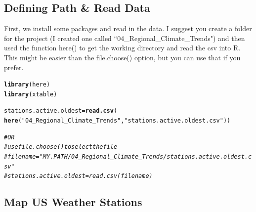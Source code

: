\documentclass{article}\usepackage[]{graphicx}\usepackage[]{xcolor}
\makeatletter
\newcommand{\hlstr}[1]{\textcolor[rgb]{0.192,0.494,0.8}{#1}}%
\newcommand{\hlcom}[1]{\textcolor[rgb]{0.678,0.584,0.686}{\textit{#1}}}%
\newcommand{\hlstd}[1]{\textcolor[rgb]{0.345,0.345,0.345}{#1}}%
\newcommand{\hlkwb}[1]{\textcolor[rgb]{0.69,0.353,0.396}{#1}}%
\newcommand{\hlkwd}[1]{\textcolor[rgb]{0.737,0.353,0.396}{\textbf{#1}}}%
\newenvironment{kframe}{%
 \def\at@end@of@kframe{}%
 \ifinner\ifhmode%
  \def\at@end@of@kframe{\end{minipage}}%
  \begin{minipage}{\columnwidth}%
 \fi\fi%
 \def\FrameCommand##1{\hskip\@totalleftmargin \hskip-\fboxsep
 \colorbox{shadecolor}{##1}\hskip-\fboxsep
     \hskip-\linewidth \hskip-\@totalleftmargin \hskip\columnwidth}%
 \MakeFramed {\advance\hsize-\width
   \@totalleftmargin\z@ \linewidth\hsize
   \@setminipage}}%
 {\par\unskip\endMakeFramed%
 \at@end@of@kframe}
\newenvironment{knitrout}{}{} %
\makeatother
\begin{document}




\subsection{Defining Path \& Read Data}

First, we install some packages and read in the data. I suggest you create a folder for the project (I created one called ``04\_Regional\_Climate\_Trends") and then used the function here() to get the working directory and read the csv into R. This might be easier than the file.choose() option, but you can use that if you prefer.

\begin{knitrout}
\color{fgcolor}\begin{kframe}
\begin{alltt}
\hlkwd{library}\hlstd{(here)}
\hlkwd{library}\hlstd{(xtable)}

\hlstd{stations.active.oldest} \hlkwb{=} \hlkwd{read.csv}\hlstd{(}
  \hlkwd{here}\hlstd{(}\hlstr{"04_Regional_Climate_Trends"}\hlstd{,} \hlstr{"stations.active.oldest.csv"}\hlstd{))}

\hlcom{# OR}
\hlcom{# use file.choose() to select the file}
\hlcom{# filename = "MY.PATH/04_Regional_Climate_Trends/stations.active.oldest.csv"}
\hlcom{# stations.active.oldest = read.csv(filename)}
\end{alltt}
\end{kframe}
\end{knitrout}


\subsection{Map US Weather Stations}
\end{document}
